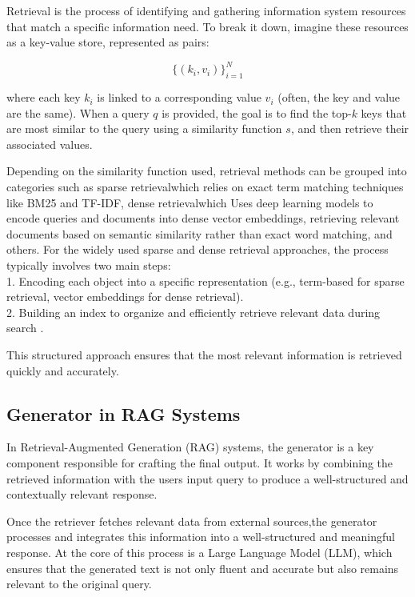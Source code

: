 \documentclass[review]{jair}
\begin{document}
Retrieval is the process of identifying and gathering information system resources that match a specific information need. To break it down, imagine these resources as a key-value store, represented as pairs:

\begin{equation}
\{(k_i, v_i)\}_{i=1}^{N}
\end{equation}

where each key \( k_i \) is linked to a corresponding value \( v_i \) (often, the key and value are the same). When a query \( q \) is provided, the goal is to find the top-\( k \) keys that are most similar to the query using a similarity function \( s \), and then retrieve their associated values\cite{gupta20241}.

Depending on the similarity function used, retrieval methods can be grouped into categories such as sparse retrieval\cite{bai2020spartermlearningtermbasedsparse}which relies on exact term matching techniques like BM25 and TF-IDF, dense retrieval\cite{karpukhin2020dpr}which Uses deep learning models to encode queries and documents into dense vector embeddings, retrieving relevant documents based on semantic similarity rather than exact word matching, and others. For the widely used sparse and dense retrieval approaches, the process typically involves two main steps:  \\
1. Encoding each object into a specific representation (e.g., term-based for sparse retrieval, vector embeddings for dense retrieval).\\
2. Building an index to organize and efficiently retrieve relevant data during search .

This structured approach ensures that the most relevant information is retrieved quickly and accurately\cite{zhao2024retrievalaugmentedgenerationaigeneratedcontent}.

\subsection{Generator  in RAG Systems}\label{subsec2}
In Retrieval-Augmented Generation (RAG) systems, the generator\cite{huang2024surveyretrievalaugmentedtextgeneration} is a key component responsible for crafting the final output. It works by combining the retrieved information with the users input query to produce a well-structured and contextually relevant response.

Once the retriever fetches relevant data from external sources,the generator processes and integrates this information into a well-structured and meaningful  response. At the core of this process is a Large Language Model (LLM), which ensures that the generated text is not only fluent and accurate but also remains relevant to the original query.
\end{document}
